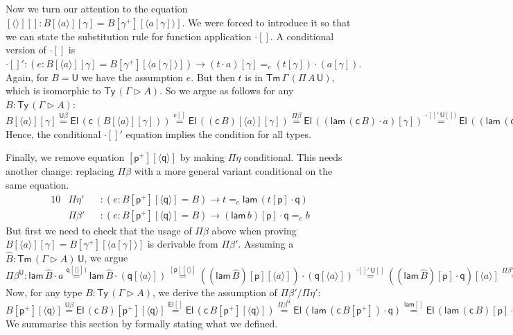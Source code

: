 \documentclass[a4paper,UKenglish]{article}
\newcommand{\ra}{\rightarrow}
\newcommand{\Ty}{\mathsf{Ty}}
\newcommand{\Tm}{\mathsf{Tm}}
\newcommand{\p}{\mathsf{p}}
\newcommand{\q}{\mathsf{q}}
\newcommand{\ext}{\mathop{\triangleright}}
\newcommand{\lam}{\mathsf{lam}}
\newcommand{\U}{\mathsf{U}}
\newcommand{\El}{\mathsf{El}}
\newcommand{\cd}{\mathsf{c}}
\begin{document}
Now we turn our attention to the equation
$
  [\langle\rangle][] : B[\langle a\rangle][\gamma] = B[\gamma^+][\langle a[\gamma]\rangle].
$
We were forced to introduce it so that we can state the substitution
rule for function application $\cdot[]$. A conditional version of
$\cdot[]$ is
$
\cdot[]' : (e : B[\langle a\rangle][\gamma] = B[\gamma^+][\langle a[\gamma]\rangle])\ra(t\cdot a)[\gamma] =_e (t[\gamma])\cdot(a[\gamma]).
$
Again, for $B = \U$ we have the assumption $e$. But then $t$ is in
$\Tm\,\Gamma\,(\Pi\,A\,\U)$, which is isomorphic to $\Ty\,(\Gamma\ext
A)$. So we argue as follows for any $B : \Ty\,(\Gamma\ext A)$:
$
  B[\langle a\rangle][\gamma] \overset{\U\beta}{=}
  \El\,(\cd\,(B[\langle a\rangle][\gamma])) \overset{\cd[]}{=}
  \El\,((\cd\,B)[\langle a\rangle][\gamma]) \overset{\Pi\beta}{=}
  \El\,((\lam\,(\cd\,B)\cdot a)[\gamma]) \overset{\cdot[]'\,\U[])}{=}
  \El\,((\lam\,(\cd\,B)[\gamma])\cdot (a[\gamma])) \overset{\lam[]}{=}
  \El\,(\lam\,(\cd\,B[\gamma^+])\cdot (a[\gamma])) \overset{\Pi\beta}{=}
  \El\,(\cd\,B[\gamma^+][\langle a[\gamma]\rangle]) \overset{\cd[]}{=}
  \El\,(\cd\,B)[\gamma^+][\langle a[\gamma]\rangle] \overset{\U\beta}{=}
  B[\gamma^+][\langle a[\gamma]\rangle].
$
Hence, the conditional $\cdot[]'$ equation implies the condition for
all types.

Finally, we remove equation $[\p^+][\langle\q\rangle]$ by making
$\Pi\eta$ conditional. This needs another change: replacing $\Pi\beta$
with a more general variant conditional on the same equation.
\begin{alignat*}{10}
  & \Pi\eta' && : (e:B[\p^+][\langle\q\rangle] = B)\ra t =_e \lam\,(t[\p]\cdot\q) \\
  & \Pi\beta' && : (e:B[\p^+][\langle\q\rangle] = B)\ra (\lam\,b)[\p]\cdot\q =_e b
\end{alignat*}
But first we need to check that the usage of $\Pi\beta$ above when
proving $B[\langle a\rangle][\gamma] = B[\gamma^+][\langle
  a[\gamma]\rangle]$ is derivable from $\Pi\beta'$. Assuming a
$\hat{B} : \Tm\,(\Gamma\ext A)\,\U$, we argue
$
  \Pi\beta^\U :{} \lam\,\hat{B}\cdot a \overset{\q[\langle\rangle])}{=}
  \lam\,\hat{B}\cdot(\q[\langle a\rangle]) \overset{[\p][\langle\rangle]}=
  ((\lam\,\hat{B})[\p][\langle a\rangle])\cdot(\q[\langle a\rangle]) \overset{\cdot[]'\,\U[]}=
  ((\lam\,\hat{B})[\p]\cdot\q)[\langle a\rangle] \overset{\Pi\beta'\,\U[]}=
  \hat{B}[\langle a\rangle].
$
Now, for any type $B : \Ty\,(\Gamma\ext A)$, we derive the assumption of $\Pi\beta'/\Pi\eta'$:
$
  B[\p^+][\langle\q\rangle] \overset{\U\beta}=
  \El\,(\cd\,B)[\p^+][\langle\q\rangle] \overset{\El[]}=
  \El\,(\cd\,B[\p^+][\langle\q\rangle]) \overset{\Pi\beta^\U}=
  \El\,(\lam\,(\cd\,B[\p^+])\cdot\q) \overset{\lam[]}= 
  \El\,(\lam\,(\cd\,B)[\p]\cdot\q) \overset{\Pi\beta'\,\U[]}=
  \El\,(\cd\,B) \overset{\U\beta}=
  B.
$
We summarise this section by formally stating what we defined.
\end{document}
